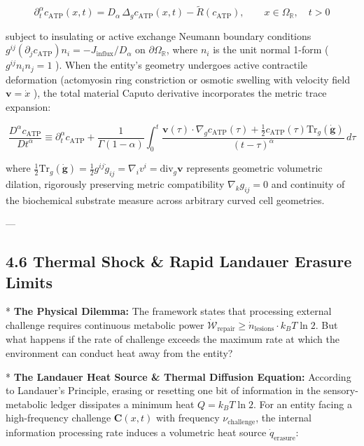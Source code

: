 \documentclass[11pt,a4paper]{article}
\theoremstyle{definition}
\theoremstyle{remark}
\begin{document}
\begin{equation}
\boxed{\partial_t^\alpha c_{\text{ATP}}(x, t) = D_\alpha \, \Delta_g c_{\text{ATP}}(x, t) - \tilde{R}(c_{\text{ATP}}), \qquad x \in \Omega_{\mathbb{R}}, \quad t > 0}
\end{equation}


subject to insulating or active exchange Neumann boundary conditions $g^{ij} (\partial_j c_{\text{ATP}}) n_i = -J_{\text{influx}} / D_\alpha$ on $\partial \Omega_{\mathbb{R}}$, where $n_i$ is the unit normal 1-form ( $g^{ij} n_i n_j = 1$ ).
When the entity's geometry undergoes active contractile deformation (actomyosin ring constriction or osmotic swelling with velocity field $\mathbf{v} = \dot{x}$ ), the total material Caputo derivative incorporates the metric trace expansion:


\begin{equation}
\frac{D^\alpha c_{\text{ATP}}}{Dt^\alpha} \equiv \partial_t^\alpha c_{\text{ATP}} + \frac{1}{\Gamma(1-\alpha)} \int_0^t \frac{\mathbf{v}(\tau) \cdot \nabla_g c_{\text{ATP}}(\tau) + \frac{1}{2} c_{\text{ATP}}(\tau) \mathrm{Tr}_g(\dot{\mathbf{g}})}{(t - \tau)^\alpha} \, d\tau
\end{equation}


where $\frac{1}{2} \mathrm{Tr}_g(\dot{\mathbf{g}}) = \frac{1}{2} g^{ij} \dot{g}_{ij} = \nabla_i v^i = \mathrm{div}_g \mathbf{v}$ represents geometric volumetric dilation, rigorously preserving metric compatibility $\nabla_k g_{ij} = 0$ and continuity of the biochemical substrate measure across arbitrary curved cell geometries.

---

\subsection{4.6 Thermal Shock \& Rapid Landauer Erasure Limits}
* \textbf{The Physical Dilemma:} The framework states that processing external challenge requires continuous metabolic power $\dot{\mathcal{W}}_{\text{repair}} \ge \dot{n}_{\text{lesions}} \cdot k_B T \ln 2$. But what happens if the rate of challenge exceeds the maximum rate at which the environment can conduct heat away from the entity?

* \textbf{The Landauer Heat Source \& Thermal Diffusion Equation:}
According to Landauer's Principle, erasing or resetting one bit of information in the sensory-metabolic ledger dissipates a minimum heat $Q = k_B T \ln 2$. For an entity facing a high-frequency challenge $\mathbf{C}(x,t)$ with frequency $\nu_{\text{challenge}}$, the internal information processing rate induces a volumetric heat source $\dot{q}_{\text{erasure}}$:
\end{document}
